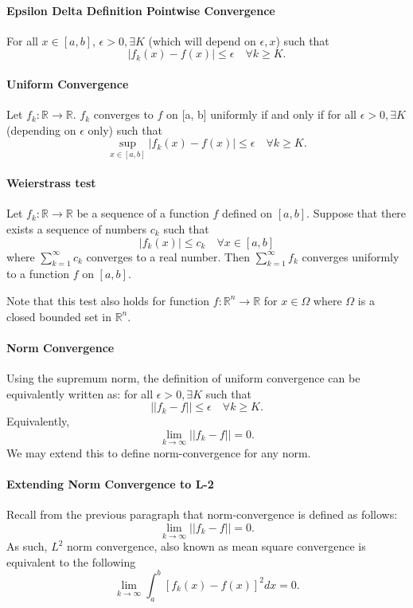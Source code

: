 \paragraph{Epsilon Delta Definition Pointwise Convergence}
For all \(x\in [a,b]\), \(\epsilon > 0, \exists K\) (which will depend on \(\epsilon, x\)) such that
\[|f_k(x) - f(x)| \leq \epsilon \quad\forall k \geq K.\]

\paragraph{Uniform Convergence}
Let \(f_k: \mathbb{R}\to \mathbb{R}\). \(f_k\) converges to \(f\) on [a, b] uniformly if and only if
for all \(\epsilon > 0, \exists K\) (depending on \(\epsilon\) only) such that
\[
\sup_{x\in [a,b]} |f_k(x) - f(x)| \leq \epsilon \quad\forall k \geq K.
\]

\paragraph{Weierstrass test}
Let \(f_k: \mathbb{R}\to \mathbb{R}\) be a sequence of a function \(f\) defined on \([a, b]\).
Suppose that there exists a sequence of numbers \(c_k\) such that
\[|f_k(x)| \leq c_k \quad \forall x\in [a, b]\]
where \(\sum_{k=1}^\infty c_k\) converges to a real number.
Then
\(\sum_{k=1}^\infty f_k\) converges uniformly to a function \(f\) on \([a, b]\).

Note that this test also holds for function \(f: \mathbb{R}^n \to \mathbb{R}\) for \(x\in \Omega\) where \(\Omega\) is a closed bounded set in \(\mathbb{R}^n\).

\paragraph{Norm Convergence}
Using the supremum norm, the definition of uniform convergence can be equivalently written as:
for all \(\epsilon > 0, \exists K\) such that
\[
    ||f_k - f|| \leq \epsilon \quad \forall k \geq K.
\]
Equivalently,
\[\lim_{k\to\infty} ||f_k - f|| = 0.\]
We may extend this to define norm-convergence for any norm.

\paragraph{Extending Norm Convergence to L-2}
Recall from the previous paragraph that norm-convergence is defined as follows:
\[\lim_{k\to\infty} ||f_k - f|| = 0.\]
As such, \(L^2\) norm convergence, also known as mean square convergence
is equivalent to the following
\[\lim_{k\to\infty} \int_a^b [f_k(x)-f(x)]^2 dx = 0.\]

